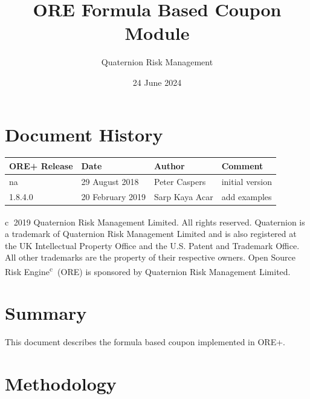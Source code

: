 \documentclass[12pt, a4paper]{article}
\begin{document}
\title{ORE Formula Based Coupon Module}
\author{Quaternion Risk Management}
\date{24 June 2024}
\maketitle

\newpage

\section*{Document History}

\begin{center}
\begin{supertabular}{|l|l|l|p{7cm}|}
\hline
ORE+ Release & Date & Author & Comment \\
\hline
na & 29 August 2018  & Peter Caspers& initial version\\
1.8.4.0 & 20 February 2019 & Sarp Kaya Acar & add examples \\
\hline
\end{supertabular}
\end{center}

\vspace{3cm}

\newpage

\tableofcontents
\vfill

\textcircled{c} 2019 Quaternion Risk Management Limited.  All rights reserved.
Quaternion\textsuperscript{\textregistered} is a trademark of Quaternion Risk Management Limited and is also registered
at the UK Intellectual Property Office and the U.S. Patent and Trademark Office.  All other trademarks are the property
of their respective owners. Open Source Risk Engine\textsuperscript{\textcircled{c}} (ORE) is sponsored by Quaternion
Risk Management Limited.

\newpage



\section{Summary}

This document describes the formula based coupon implemented in ORE+.



\section{Methodology}
\label{ssection_FormulaBasedLeg}
\end{document}
